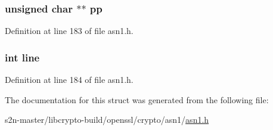 \subsubsection[{\texorpdfstring{pp}{pp}}]{\setlength{\rightskip}{0pt plus 5cm}unsigned char $\ast$$\ast$ pp}\hypertarget{structasn1__ctx__st_a46042b5ff30d2b6751320722b9f2f1c0}{}\label{structasn1__ctx__st_a46042b5ff30d2b6751320722b9f2f1c0}


Definition at line 183 of file asn1.\+h.

\subsubsection[{\texorpdfstring{line}{line}}]{\setlength{\rightskip}{0pt plus 5cm}int line}\hypertarget{structasn1__ctx__st_a41ebd28ef1d7c6ade45642cb6acc1039}{}\label{structasn1__ctx__st_a41ebd28ef1d7c6ade45642cb6acc1039}


Definition at line 184 of file asn1.\+h.



The documentation for this struct was generated from the following file\+:\begin{DoxyCompactItemize}
\item 
s2n-\/master/libcrypto-\/build/openssl/crypto/asn1/\hyperlink{crypto_2asn1_2asn1_8h}{asn1.\+h}\end{DoxyCompactItemize}
